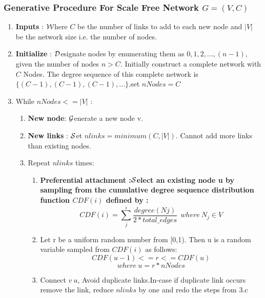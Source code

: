 \documentclass{article}
\begin{document}
\subsubsection{Generative Procedure For Scale Free Network $G=(V,C)$}
\begin{enumerate}
\item \textbf{Inputs} : $\cal W$here $C$ be the number of links to add to each new node and $|V|$ be the network size i.e. the number of nodes.
\item \textbf{Initialize} : $\cal D$esignate nodes by enumerating them as        $0,1,2, . . . , (n-1)$, given the number of nodes $ n > C $. Initially construct a complete network with $C$ Nodes. The degree sequence of this complete network is $\{(C-1),(C-1),(C-1),...\}$.set $ nNodes=C$
\item While $nNodes<=|V|$ :
\begin{enumerate}
\item \textbf{New node}: $\cal G$enerate a new node v.
\item \textbf{New links} : $\cal S $et $nlinks =  minimum (C, |V|)$. Cannot add more links than existing nodes.
\item Repeat $nlinks$ times:
\begin{enumerate}
\item \bf Preferential attachment \rm :$\cal S$elect an existing node u by sampling from the cumulative degree sequence distribution function $CDF(i)$ defined by :
\begin{equation}
CDF(i) =\sum^{i}_{j}\frac{degree(Nj)}{2*total\_edges}\ \ where\ N_j \in V
\end{equation} 
\item \cal Let r be a uniform random number from [0,1). Then u is a random variable sampled from $CDF(i)$ as follows:
\begin{equation}
CDF(u-1)  <= r <= CDF(u)
\end{equation}
\begin{equation}
where\ u =r*nNodes
\end{equation}

\item \cal Connect $v~u$, Avoid duplicate links.In-case if duplicate link occurs remove the link, reduce $nlinks$ by one and redo the steps from 3.c
\end{enumerate}
\end{enumerate}
\end{enumerate}
\end{document}
